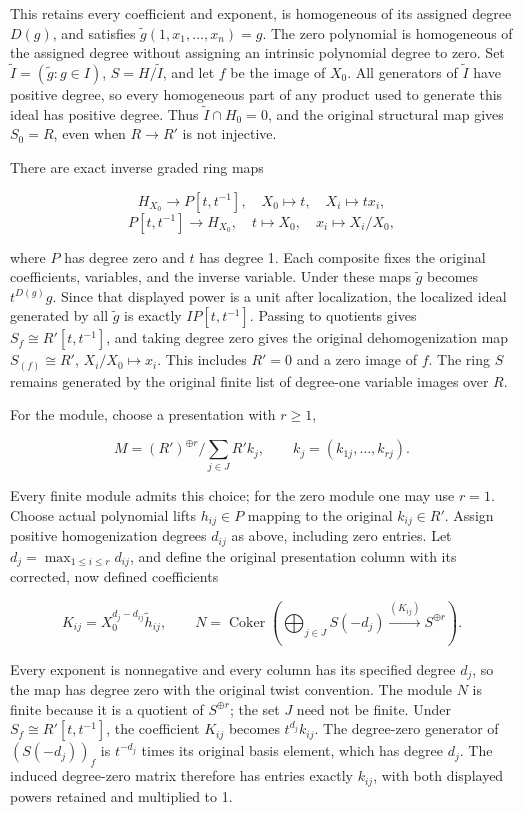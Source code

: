 This retains every coefficient and exponent, is homogeneous of its assigned degree \(D(g)\), and satisfies \(\widetilde g(1,x_1,\ldots,x_n)=g\). The zero polynomial is homogeneous of the assigned degree without assigning an intrinsic polynomial degree to zero. Set \(\widetilde I=(\widetilde g:g\in I)\), \(S=H/\widetilde I\), and let \(f\) be the image of \(X_0\). All generators of \(\widetilde I\) have positive degree, so every homogeneous part of any product used to generate this ideal has positive degree. Thus \(\widetilde I\cap H_0=0\), and the original structural map gives \(S_0=R\), even when \(R\to R'\) is not injective.

There are exact inverse graded ring maps

\[
H_{X_0}\longrightarrow P[t,t^{-1}],\quad X_0\mapsto t,\quad X_i\mapsto t x_i,
\] \[
P[t,t^{-1}]\longrightarrow H_{X_0},\quad t\mapsto X_0,\quad x_i\mapsto X_i/X_0,
\]

where \(P\) has degree zero and \(t\) has degree 1. Each composite fixes the original coefficients, variables, and the inverse variable. Under these maps \(\widetilde g\) becomes \(t^{D(g)}g\). Since that displayed power is a unit after localization, the localized ideal generated by all \(\widetilde g\) is exactly \(I P[t,t^{-1}]\). Passing to quotients gives \(S_f\cong R'[t,t^{-1}]\), and taking degree zero gives the original dehomogenization map \(S_{(f)}\cong R'\), \(X_i/X_0\mapsto x_i\). This includes \(R'=0\) and a zero image of \(f\). The ring \(S\) remains generated by the original finite list of degree-one variable images over \(R\).

For the module, choose a presentation with \(r\geq1\),

\[
M=(R')^{\oplus r}/\sum_{j\in J}R'k_j,\qquad
k_j=(k_{1j},\ldots,k_{rj}).
\]

Every finite module admits this choice; for the zero module one may use \(r=1\). Choose actual polynomial lifts \(h_{ij}\in P\) mapping to the original \(k_{ij}\in R'\). Assign positive homogenization degrees \(d_{ij}\) as above, including zero entries. Let \(d_j=\max_{1\leq i\leq r}d_{ij}\), and define the original presentation column with its corrected, now defined coefficients

\[
K_{ij}=X_0^{d_j-d_{ij}}\widetilde h_{ij},\qquad
N=\operatorname{Coker}\left(\bigoplus_{j\in J}S(-d_j)
 \xrightarrow{(K_{ij})} S^{\oplus r}\right).
\]

Every exponent is nonnegative and every column has its specified degree \(d_j\), so the map has degree zero with the original twist convention. The module \(N\) is finite because it is a quotient of \(S^{\oplus r}\); the set \(J\) need not be finite. Under \(S_f\cong R'[t,t^{-1}]\), the coefficient \(K_{ij}\) becomes \(t^{d_j}k_{ij}\). The degree-zero generator of \((S(-d_j))_f\) is \(t^{-d_j}\) times its original basis element, which has degree \(d_j\). The induced degree-zero matrix therefore has entries exactly \(k_{ij}\), with both displayed powers retained and multiplied to 1.

